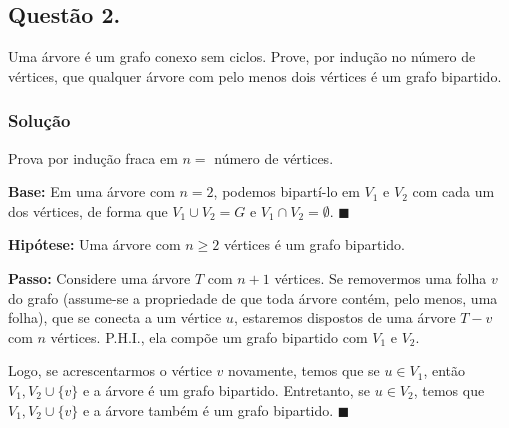 \documentclass[12pt, letterpaper]{report}
\newcommand*{\CQD}{\hfill\ensuremath{\blacksquare}}%
\newcounter{ProblemNum}
\newcommand*{\anyproblem}[1]{\newpage\subsection*{#1}}
\newcommand*{\problem}[1]{\stepcounter{ProblemNum} %
   \anyproblem{Questão #1}}
\newcommand*{\soln}[1]{\subsubsection*{#1}}
\newcommand*{\solution}{\soln{Solução}}
\begin{document}
\problem{2.}
  Uma árvore é um grafo conexo sem ciclos. Prove, por indução no número de vértices, que qualquer árvore com pelo menos dois vértices é um grafo bipartido.

\solution
  Prova por indução fraca em $n = $ número de vértices.

  \textbf{Base:} Em uma árvore com $n = 2$, podemos bipartí-lo em $V_1$ e $V_2$ com cada um dos vértices, de forma que $V_1 \cup V_2 = G$ e $V_1 \cap V_2 = \emptyset$. \CQD

  \textbf{Hipótese:} Uma árvore com $n \geq 2$ vértices é um grafo bipartido.
 
  \textbf{Passo:} Considere uma árvore $T$ com $n + 1$ vértices. Se removermos uma folha $v$ do grafo (assume-se a propriedade de que toda árvore contém, pelo menos, uma folha), que se conecta a um vértice $u$, estaremos dispostos de uma árvore $T - v$ com $n$ vértices. P.H.I., ela compõe um grafo bipartido com $V_1$ e $V_2$.

  Logo, se acrescentarmos o vértice $v$ novamente, temos que se $u \in V_1$, então $V_1, V_2 \cup \{v\}$ e a árvore é um grafo bipartido. Entretanto, se $u \in V_2$, temos que $V_1, V_2 \cup \{v\}$ e a árvore também é um grafo bipartido. \CQD
\end{document}
